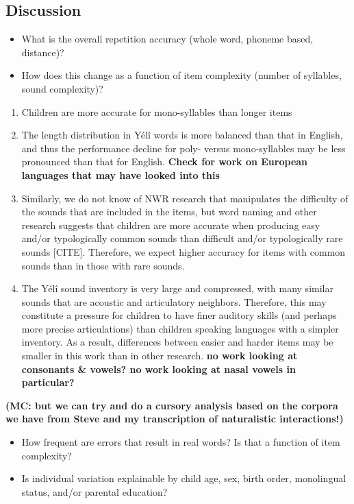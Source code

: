 \documentclass[english,,man,floatsintext]{apa6}
\providecommand{\tightlist}{%
  \setlength{\itemsep}{0pt}\setlength{\parskip}{0pt}}
\begin{document}
\subsection{Discussion}\label{discussion}

\begin{itemize}
\item
  What is the overall repetition accuracy (whole word, phoneme based,
  distance)?
\item
  How does this change as a function of item complexity (number of
  syllables, sound complexity)?
\end{itemize}

\begin{enumerate}
\def\labelenumi{\arabic{enumi}.}
\item
  Children are more accurate for mono-syllables than longer items
\item
  The length distribution in Yélî words is more balanced than that in
  English, and thus the performance decline for poly- versus
  mono-syllables may be less pronounced than that for English.
  \textbf{Check for work on European languages that may have looked into
  this}
\item
  Similarly, we do not know of NWR research that manipulates the
  difficulty of the sounds that are included in the items, but word
  naming and other research suggests that children are more accurate
  when producing easy and/or typologically common sounds than difficult
  and/or typologically rare sounds {[}CITE{]}. Therefore, we expect
  higher accuracy for items with common sounds than in those with rare
  sounds.
\item
  The Yélî sound inventory is very large and compressed, with many
  similar sounds that are acoustic and articulatory neighbors.
  Therefore, this may constitute a pressure for children to have finer
  auditory skills (and perhaps more precise articulations) than children
  speaking languages with a simpler inventory. As a result, differences
  between easier and harder items may be smaller in this work than in
  other research. \textbf{no work looking at consonants \& vowels? no
  work looking at nasal vowels in particular?}
\end{enumerate}

\textbf{(MC: but we can try and do a cursory analysis based on the
corpora we have from Steve and my transcription of naturalistic
interactions!)}

\begin{itemize}
\tightlist
\item
  How frequent are errors that result in real words? Is that a function
  of item complexity?
\item
  Is individual variation explainable by child age, sex, birth order,
  monolingual status, and/or parental education?
\end{itemize}
\end{document}
